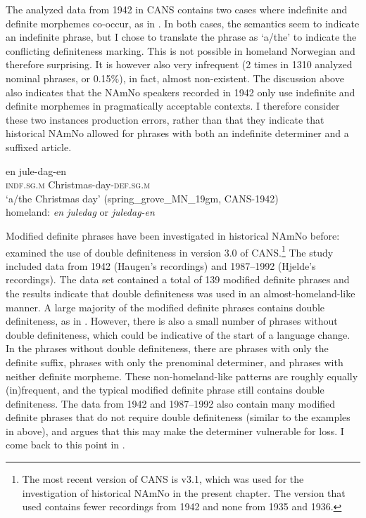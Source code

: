\documentclass[output=paper]{langscibook}
\begin{document}

The analyzed data from 1942 in CANS contains two cases where indefinite and definite morphemes co-occur, as in . In both cases, the semantics seem to indicate an indefinite phrase, but I chose to translate the phrase as `a/the' to indicate the conflicting definiteness marking. This is not possible in homeland Norwegian and therefore surprising. It is however also very infrequent (2 times in 1310 analyzed nominal phrases, or 0.15\%), in fact, almost non-existent. The discussion above also indicates that the NAmNo speakers recorded in 1942 only use indefinite and definite morphemes in pragmatically acceptable contexts. I therefore consider these two instances production errors, rather than that they indicate that historical NAmNo allowed for phrases with both an indefinite determiner and a suffixed article.
 

\ea \label{ex:vanbaal:16}
\gll en jule-dag-en \\
    \textsc{indf.sg.m} Christmas-day-\textsc{def.sg.m} \\
\glt `a/the Christmas day' (spring\_grove\_MN\_19gm, CANS-1942) \\
homeland: \textit{en juledag} or \textit{juledag-en}
\z 

Modified definite phrases have been investigated in historical NAmNo before: \citet{vanBaal2022New} examined the use of double definiteness in version 3.0 of CANS.\footnote{The most recent version of CANS is v3.1, which was used for the investigation of historical NAmNo in the present chapter. The version that \citet{vanBaal2022New} used contains fewer recordings from 1942 and none from 1935 and 1936.} The study included data from 1942 (Haugen's recordings) and 1987--1992 (Hjelde's recordings). The data set contained a total of 139 modified definite phrases and the results indicate that double definiteness was used in an almost-homeland-like manner. A large majority of the modified definite phrases contains double definiteness, as in . However, there is also a small number of phrases without double definiteness, which could be indicative of the start of a language change. In the phrases without double definiteness, there are phrases with only the definite suffix, phrases with only the prenominal determiner, and phrases with neither definite morpheme. These non-homeland-like patterns are roughly equally (in)frequent, and the typical modified definite phrase still contains double definiteness. The data from 1942 and 1987--1992 also contain many modified definite phrases that do not require double definiteness (similar to the examples in  above), and \citet{vanBaal2022New} argues that this may make the determiner vulnerable for loss. I come back to this point in .
 
\end{document}
